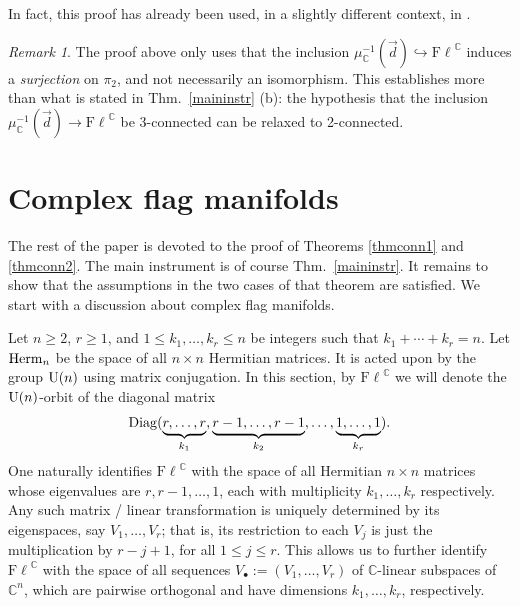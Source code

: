 \documentclass[12pt]{amsart}
\theoremstyle{definition}
\theoremstyle{remark}
\newtheorem{rem}[thm]{Remark}
\newcommand{\CC}{\mathbb C}
\newcommand{\Fl}{{\mathrm{F\ell}}}
\begin{document}
 
 In fact, this proof has already been used, in a slightly different context,  
in \cite[Sect.~4, Proof of Theorem 1.1]{Ma2}. 

\begin{rem} The proof above only uses that the inclusion
$
\mu_{\mathbb C}^{-1}(\vec d)\hookrightarrow \Fl^{\mathbb C}
$
induces a {\it surjection} on $\pi_2$, and not necessarily an isomorphism. 
This establishes more than what is stated in Thm.~\ref{maininstr} (b): the hypothesis that the inclusion 
$\mu_\CC^{-1}(\vec{d}) \to \Fl^\CC$  be 
3-connected can be relaxed to 
2-connected. 
\end{rem}



\section{Complex flag manifolds}\label{sect1}


The rest of the paper is devoted to the proof of Theorems \ref{thmconn1} and \ref{thmconn2}. 
The main instrument is of course Thm.~\ref{maininstr}. It remains to show that the assumptions in the two cases of that theorem are satisfied. We start with a  discussion about complex flag manifolds. 

Let $n\ge 2$, $r\ge 1$, and $1\le k_1, \ldots, k_r \le n$ be integers such that $k_1+ \cdots + k_r=n$. Let ${\rm Herm}_n$ be the space of all $n\times n$ Hermitian matrices. It is acted upon by the group ${\rm U}(n)$ using matrix conjugation. In this section, by
$\Fl^\CC$ we will denote the   ${\rm U}(n)$-orbit of the  diagonal matrix 
$${\rm Diag} (\underbrace{r, \dots, r}_{k_1},
\underbrace{r-1, \dots, r-1}_{k_2},
\dots,
\underbrace{1, \dots, 1}_{k_r}).$$
One naturally identifies $\Fl^\CC$ with the space of all Hermitian $n\times n$ matrices whose eigenvalues are $r, r-1, \ldots, 1$, each with multiplicity $k_1, \ldots, k_r$ respectively. Any such matrix / linear transformation is uniquely determined by its eigenspaces, say $V_1, \ldots, V_r$; that is, its restriction to each $V_j$ is just the multiplication by $r-j+1$, for all $1\le j\le r$. This allows us to further identify $\Fl^\CC$ with the space of all sequences $V_\bullet:=(V_1, \ldots, V_r)$ of $\CC$-linear subspaces of $\CC^n$, which are pairwise orthogonal and  have dimensions $k_1, \ldots, k_r$, respectively.
\end{document}
